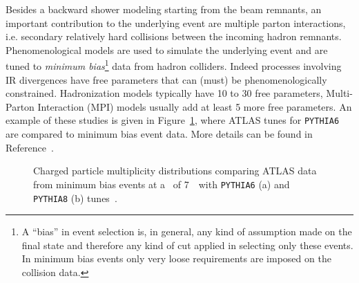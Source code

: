 Besides a backward shower modeling starting from the beam remnants, an
important contribution to the underlying event are multiple parton interactions,
i.e. secondary relatively hard collisions between the incoming hadron remnants.
Phenomenological models are used to simulate the underlying event
and are tuned to {\it minimum bias}\footnote{A ``bias'' in event selection
is, in general, any kind of assumption made on the final state and therefore
any kind of cut applied in selecting only these events. In minimum bias events
only very loose requirements are imposed on the collision data.} %
data from hadron colliders. Indeed processes involving IR divergences 
have free parameters that can (must) be phenomenologically constrained.
Hadronization models typically have 10 to 30 free parameters, 
Multi-Parton Interaction (MPI) models usually add at least 5 more
free parameters. An example of these studies is given in 
Figure~\ref{fig:minbiastune}, where ATLAS tunes for \texttt{PYTHIA6}
are compared to minimum bias event data. More details can be found
in Reference~\cite{Buckley:2011vq}.

\begin{figure}[htb]\begin{center}
	\caption{Charged particle multiplicity distributions comparing ATLAS
        data from minimum bias events at a \cme\ of 7~\tev\ 
        with  \texttt{PYTHIA6} (a) and  \texttt{PYTHIA8} (b) tunes~\cite{Buckley:2011vq}.\label{fig:minbiastune}}
\end{center}\end{figure}



